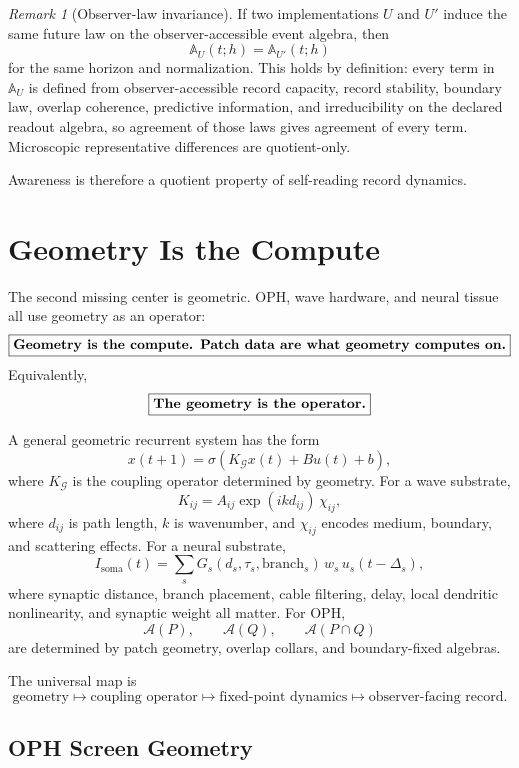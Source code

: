 \documentclass[11pt]{article}
\theoremstyle{remark}
\newtheorem{remark}[theorem]{Remark}
\theoremstyle{plain}
\begin{document}
\begin{remark}[Observer-law invariance]
If two implementations \(U\) and \(U'\) induce the same future law on the observer-accessible event algebra, then
\[
\mathbb A_U(t;h)=\mathbb A_{U'}(t;h)
\]
for the same horizon and normalization. This holds by definition: every term in \(\mathbb A_U\) is defined from observer-accessible record capacity, record stability, boundary law, overlap coherence, predictive information, and irreducibility on the declared readout algebra, so agreement of those laws gives agreement of every term. Microscopic representative differences are quotient-only.
\end{remark}

Awareness is therefore a quotient property of self-reading record dynamics.

\section{Geometry Is the Compute}

The second missing center is geometric. OPH, wave hardware, and neural tissue all use geometry as an operator:
\[
\boxed{
\text{\bfseries Geometry is the compute. Patch data are what geometry computes on.}
}
\]
Equivalently,
\[
\boxed{
\text{\bfseries The geometry is the operator.}
}
\]

A general geometric recurrent system has the form
\[
x(t+1)=\sigma\!\left(K_{\mathcal G}x(t)+Bu(t)+b\right),
\]
where \(K_{\mathcal G}\) is the coupling operator determined by geometry. For a wave substrate,
\[
K_{ij}=A_{ij}\exp(i k d_{ij})\,\chi_{ij},
\]
where \(d_{ij}\) is path length, \(k\) is wavenumber, and \(\chi_{ij}\) encodes medium, boundary, and scattering effects. For a neural substrate,
\[
I_{\mathrm{soma}}(t)
=
\sum_s
G_s(d_s,\tau_s,\mathrm{branch}_s)\,
w_s\,
u_s(t-\Delta_s),
\]
where synaptic distance, branch placement, cable filtering, delay, local dendritic nonlinearity, and synaptic weight all matter. For OPH,
\[
\mathcal A(P),\qquad \mathcal A(Q),\qquad \mathcal A(P\cap Q)
\]
are determined by patch geometry, overlap collars, and boundary-fixed algebras.

The universal map is
\[
\boxed{
\text{geometry}
\longmapsto
\text{coupling operator}
\longmapsto
\text{fixed-point dynamics}
\longmapsto
\text{observer-facing record}.
}
\]

\subsection{OPH Screen Geometry}
\end{document}
